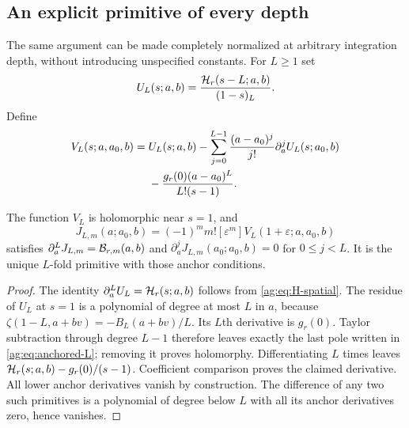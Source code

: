 \subsection{An explicit primitive of every depth}
The same argument can be made completely normalized at arbitrary
integration depth, without introducing unspecified constants.
For $L\ge1$ set
\[
 U_L(s;a,b)=\frac{\mathcal H_r(s-L;a,b)}{(1-s)_L}.
\]
Define
\begin{align}
 V_L(s;a,a_0,b)={}&U_L(s;a,b)
 -\sum_{j=0}^{L-1}\frac{(a-a_0)^j}{j!}\partial_a^jU_L(s;a_0,b)\notag\\
 &-\frac{g_r(0)(a-a_0)^L}{L!(s-1)}.
 \label{ag:eq:anchored-L}
\end{align}
\begin{theorem}\label{ag:thm:all-primitives}
The function $V_L$ is holomorphic near $s=1$, and
\begin{equation}\label{ag:eq:all-primitives}
 J_{L,m}(a;a_0,b)=(-1)^m m![\varepsilon^m]
                          V_L(1+\varepsilon;a,a_0,b)
\end{equation}
satisfies
$\partial_a^LJ_{L,m}=\mathcal B_{r,m}(a,b)$ and
$\partial_a^jJ_{L,m}(a_0;a_0,b)=0$ for $0\le j<L$.
It is the unique $L$-fold primitive with those anchor conditions.
\end{theorem}
\begin{proof}
The identity $\partial_a^LU_L=\mathcal H_r(s;a,b)$ follows from
\eqref{ag:eq:H-spatial}. The residue of $U_L$ at $s=1$ is a polynomial
of degree at most $L$ in $a$, because
$\zeta(1-L,a+bv)=-B_L(a+bv)/L$. Its $L$th derivative is $g_r(0)$.
Taylor subtraction through degree $L-1$ therefore leaves exactly the
last pole written in \eqref{ag:eq:anchored-L}; removing it proves
holomorphy. Differentiating $L$ times leaves
$\mathcal H_r(s;a,b)-g_r(0)/(s-1)$. Coefficient comparison proves the
claimed derivative. All lower anchor derivatives vanish by construction.
The difference of any two such primitives is a polynomial of degree
below $L$ with all its anchor derivatives zero, hence vanishes.
\end{proof}
